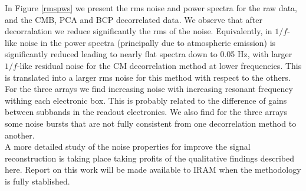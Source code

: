 In Figure \ref{rmspws} we present the rms noise and power spectra for the raw data, and the CMB, PCA and BCP decorrelated data. 
We observe that after decorralation we reduce significantly the rms of the noise. Equivalently, in $1/f$-like noise in the power spectra (principally due to atmospheric emission) is significantly reduced leading to nearly flat spectra down to 0.05 Hz, with larger $1/f$-like residual noise for the CM decorrelation method at lower frequencies. This is translated into a larger rms noise for this method with respect to the others. For the three arrays we find increasing noise with increasing resonant frequency withing each electronic box. This is probably related to the difference of gains between subbands in the readout electronics. We also find for the three arrays some noise bursts that are not fully consistent from one decorrelation method to another. \\

A more detailed study of the noise properties for improve the signal reconstruction is taking place taking profits of the qualitative findings described here. Report on this work will be made available to IRAM when the methodology is fully stablished.
